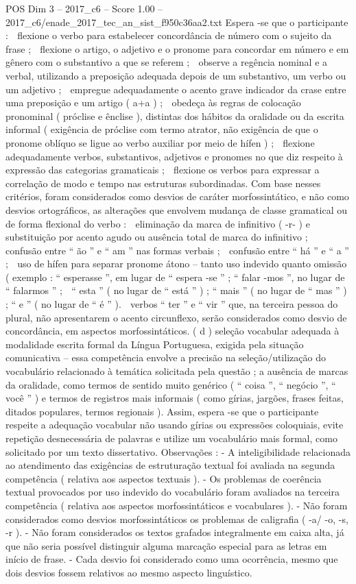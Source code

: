 \begin{textsample}{POS Dim 3 – 2017\_c6 – Score 1.00 – 2017\_c6/enade\_2017\_tec\_an\_sist\_f950c36aa2.txt}
Espera -se que o participante :  flexione o verbo para estabelecer concordância de número com o sujeito da frase ;  flexione o artigo, o adjetivo e o pronome para concordar em número e em gênero com o substantivo a que se referem ;  observe a regência nominal e a verbal, utilizando a preposição adequada depois de um substantivo, um verbo ou um adjetivo ;  empregue adequadamente o acento grave indicador da crase entre uma preposição e um artigo ( a+a ) ;  obedeça às regras de colocação pronominal ( próclise e ênclise ), distintas dos hábitos da oralidade ou da escrita informal ( exigência de próclise com termo atrator, não exigência de que o pronome oblíquo se ligue ao verbo auxiliar por meio de hífen ) ;  flexione adequadamente verbos, substantivos, adjetivos e pronomes no que diz respeito à expressão das categorias gramaticais ;  flexione os verbos para expressar a correlação de modo e tempo nas estruturas subordinadas.
Com base nesses critérios, foram considerados como desvios de caráter morfossintático, e não como desvios ortográficos, as alterações que envolvem mudança de classe gramatical ou de forma flexional do verbo :  eliminação da marca de infinitivo ( -r- ) e substituição por acento agudo ou ausência total de marca do infinitivo ;  confusão entre “ ão ” e “ am ” nas formas verbais ;  confusão entre “ há ” e “ a ” ;  uso de hífen para separar pronome átono – tanto uso indevido quanto omissão ( exemplo : “ esperasse ”, em lugar de “ espera -se ” ; “ falar -mos ”, no lugar de “ falarmos ” ;  “ esta ” ( no lugar de “ está ” ) ; “ mais ” ( no lugar de “ mas ” ) ; “ e ” ( no lugar de “ é ” ).  verbos “ ter ” e “ vir ” que, na terceira pessoa do plural, não apresentarem o acento circunflexo, serão considerados como desvio de concordância, em aspectos morfossintáticos. ( d ) seleção vocabular adequada à modalidade escrita formal da Língua Portuguesa, exigida pela situação comunicativa – essa competência envolve a precisão na seleção/utilização do vocabulário relacionado à temática solicitada pela questão ; a ausência de marcas da oralidade, como termos de sentido muito genérico ( “ coisa ”, “ negócio ”, “ você ” ) e termos de registros mais informais ( como gírias, jargões, frases feitas, ditados populares, termos regionais ).
Assim, espera -se que o participante respeite a adequação vocabular não usando gírias ou expressões coloquiais, evite repetição desnecessária de palavras e utilize um vocabulário mais formal, como solicitado por um texto dissertativo.
Observações : - A inteligibilidade relacionada ao atendimento das exigências de estruturação textual foi avaliada na segunda competência ( relativa aos aspectos textuais ). - Os problemas de coerência textual provocados por uso indevido do vocabulário foram avaliados na terceira competência ( relativa aos aspectos morfossintáticos e vocabulares ). - Não foram considerados como desvios morfossintáticos os problemas de caligrafia ( -a/ -o, -s, -r ). - Não foram considerados os textos grafados integralmente em caixa alta, já que não seria possível distinguir alguma marcação especial para as letras em início de frase. - Cada desvio foi considerado como uma ocorrência, mesmo que dois desvios fossem relativos ao mesmo aspecto linguístico.

\end{textsample}
